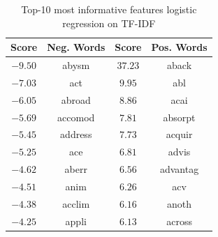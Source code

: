 \documentclass[11pt]{article}
\begin{document}
\begin{minipage}[b]{0.48\textwidth}
    \begin{table}[H]
        \begin{center}
            \begin{tabular}{||c||c|c|c||}
                \hline
                Score & Neg. Words & Score & Pos. Words\\
                \hline
                \hline
                $-9.50$ & abysm & $37.23$ & aback  \\   \hline     
            	$-7.03$ & act & $9.95$ & abl    \\         \hline
            	$-6.05$ & abroad & $8.86$ & acai     \\       \hline
            	$-5.69$ & accomod & $7.81$ & absorpt  \\       \hline
            	$-5.45$ & address & $7.73$ & acquir   \\       \hline
            	$-5.25$ & ace & $6.81$ & advis    \\       \hline
            	$-4.62$ & aberr & $6.56$ & advantag \\       \hline
            	$-4.51$ & anim & $6.26$ & acv   \\          \hline
            	$-4.38$ & acclim & $6.16$ & anoth \\          \hline
            	$-4.25$ & appli & $6.13$ & across\\ \hline
                \hline
                \hline
            \end{tabular}
        \caption{Top-10 most informative features logistic regression on TF-IDF}
        \label{logreg_t2}
        \end{center}
    \end{table}
\end{minipage}
\end{document}
